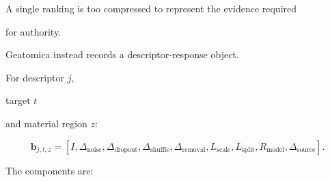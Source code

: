 \documentclass[11pt,a4paper,oneside]{report}
\begin{document}
A single ranking is too compressed to represent the evidence required

for authority.



Geatomica instead records a descriptor-response object.



For descriptor $j$,

target $t$

and material region $z$:



\begin{equation}
\label{eq:barcode}
\mathbf{b}_{j,t,z}
=
\left[
I,
\Delta_{\mathrm{noise}},
\Delta_{\mathrm{dropout}},
\Delta_{\mathrm{shuffle}},
\Delta_{\mathrm{removal}},
L_{\mathrm{scale}},
L_{\mathrm{split}},
R_{\mathrm{model}},
\Delta_{\mathrm{source}}
\right].
\end{equation}



The components are:
\end{document}
